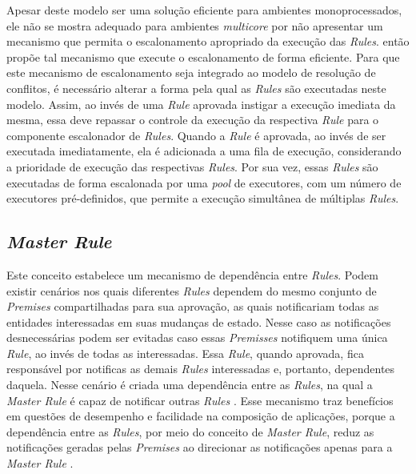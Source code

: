 \FloatBarrier

Apesar deste modelo ser uma solução eficiente para ambientes monoprocessados,
ele não se mostra adequado para ambientes \textit{multicore} por não apresentar
um mecanismo que permita o escalonamento apropriado da execução das
\textit{Rules}.  então propõe tal mecanismo que
execute o escalonamento de forma eficiente. Para que este mecanismo de
escalonamento seja integrado ao modelo de resolução de conflitos, é necessário
alterar a forma pela qual as \textit{Rules} são executadas neste modelo. Assim, ao invés
de uma \textit{Rule} aprovada instigar a execução imediata da mesma, essa deve
repassar o controle da execução da respectiva \textit{Rule} para o componente
escalonador de \textit{Rules}. Quando a \textit{Rule} é aprovada, ao invés de ser
executada imediatamente, ela é adicionada a uma fila de execução, considerando a
prioridade de execução das respectivas \textit{Rules}. Por sua vez, essas
\textit{Rules} são executadas de forma escalonada por uma \textit{pool} de
executores, com um número de executores pré-definidos, que permite a execução
simultânea de múltiplas \textit{Rules}.

\subsection{\textit{Master Rule}}

Este conceito estabelece um mecanismo de dependência entre \textit{Rules}. Podem
existir cenários nos quais diferentes \textit{Rules} dependem do mesmo conjunto
de \textit{Premises} compartilhadas para sua aprovação, as quais notificariam
todas as entidades interessadas em suas mudanças de estado. Nesse caso as
notificações desnecessárias podem ser evitadas caso essas \textit{Premisses}
notifiquem uma única \textit{Rule}, ao invés de todas as interessadas. Essa
\textit{Rule}, quando aprovada, fica responsável por notificas as demais
\textit{Rules} interessadas e, portanto, dependentes daquela. Nesse cenário é
criada uma dependência entre as \textit{Rules}, na qual a \textit{Master Rule} é
capaz de notificar outras \textit{Rules} \cite{msc_Ronszcka_2012}. Esse
mecanismo traz benefícios em questões de desempenho e facilidade na composição
de aplicações, porque a dependência entre as \textit{Rules}, por meio do
conceito de \textit{Master Rule}, reduz as notificações geradas pelas
\textit{Premises} ao direcionar as notificações apenas para a \textit{Master
Rule} \cite{msc_Ronszcka_2012}.

